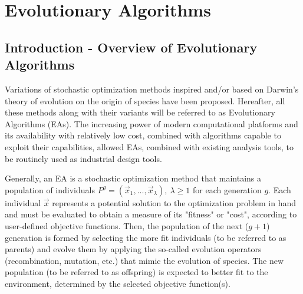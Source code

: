 \chapter{Evolutionary Algorithms} %


\ifpdf
    \graphicspath{{2/figures/PNG/}{2/figures/PDF/}{2/figures/}}
\else
    \graphicspath{{2/figures/EPS/}{2/figures/}}
\fi


\section{Introduction - Overview of Evolutionary Algorithms}
Variations of stochastic optimization methods inspired and/or based on Darwin's theory of evolution on the origin of species \cite{Darwin} have been proposed. Hereafter, all these methods along with their variants will be referred to as Evolutionary Algorithms (EAs). The increasing power of modern computational platforms and its availability with relatively low cost, combined with algorithms capable to exploit their capabilities,  allowed EAs, combined with existing analysis tools, to be routinely used as industrial design tools.     

Generally, an EA is a stochastic optimization method that maintains a population of individuals $P^g=(\vec{x}_1,...,\vec{x}_{\lambda}),~\lambda \ge 1$ for each generation $g$. Each individual $\vec{x}$ represents a potential solution to the optimization problem in hand and must be evaluated to obtain a measure of its "fitness" or "cost", according to user-defined objective functions. Then, the population of the next ($g+1$) generation is formed by selecting the more fit individuals (to be referred to as parents) and evolve them by applying the so-called evolution operators (recombination, mutation, etc.) that mimic the evolution of species. The new population (to be referred to as offspring) is expected to better fit to the environment, determined by the selected objective function(s).     

